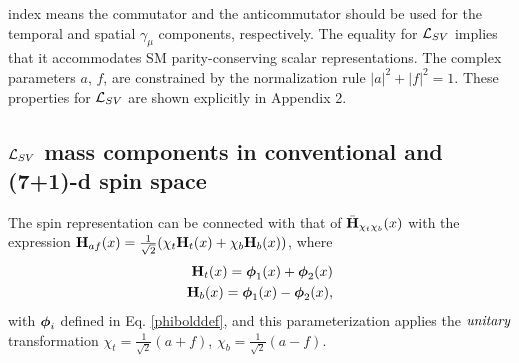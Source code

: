 \documentclass[12pt]{article}
\renewcommand\[{\begin{dmath}}
\renewcommand\]{\end{dmath}}
\newcommand{\boldmathphi}{\mbox{\boldmath$\phi$\unboldmath}}
\begin{document}
  index means the commutator and  the anticommutator should be used for the  temporal and spatial  $\gamma_\mu$ components,  respectively.
The equality for ${\cal L}_{SV}$  implies   that    it        accommodates SM  parity-conserving scalar representations.
  The complex parameters  $a$, $f$, are constrained by the normalization rule $|a|^2+|f|^2=1$. These properties for ${\cal L}_{SV}$ are shown explicitly in Appendix 2.


\subsection{${\cal L}_{SV}$ mass components in conventional and  (7+1)-d spin space}

The spin  representation can be connected with that of  $\bar{\bf H}_{\chi_t   \chi_b}(x)$ with the expression  ${\bf H}_{af}(x) = \frac{1} {\sqrt{2}}(\chi_t  {\bf H}_t(x)+ \chi_b  {\bf H}_b(x)  )$,   where  \begin{eqnarray}
\label{DefHtHb} {\bf H}_{t}(x)=  { \boldmathphi}_1(x)+{ \boldmathphi}_2(x) \\ \nonumber  {\bf H}_{b}(x)=   { \boldmathphi}_1(x)-{ \boldmathphi}_2(x),  \end{eqnarray}  with ${ \boldmathphi}_i $   defined in   Eq.   \ref{phibolddef}, and  this  parameterization applies the  $\it unitary$ transformation
    $\chi_t=\frac{1} {\sqrt{2}}(a+f)$, $\chi_b=\frac{1} {\sqrt{2}}(a-f)$.
\end{document}
